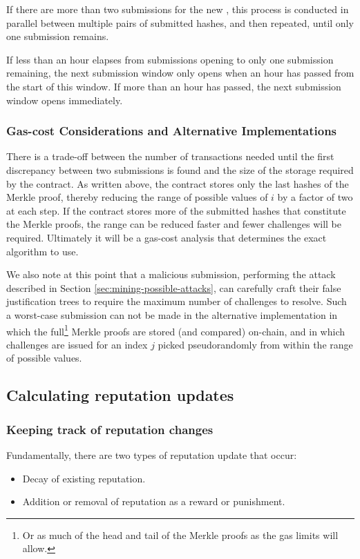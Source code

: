 If there are more than two submissions for the new , this process is conducted in parallel between multiple pairs of submitted hashes, and then repeated, until only one submission remains.

If less than an hour elapses from submissions opening to only one submission remaining, the next submission window only opens when an hour has passed from the start of this window. If more than an hour has passed, the next submission window opens immediately.

\subsubsection*{Gas-cost Considerations and Alternative Implementations}
There is a trade-off between the number of transactions needed until the first discrepancy between two submissions is found and the size of the storage required by the contract. As written above, the contract stores only the last hashes of the Merkle proof, thereby reducing the range of possible values of $i$ by a factor of two at each step. If the contract stores more of the submitted hashes that constitute the Merkle proofs, the range can be reduced faster and fewer challenges will be required. Ultimately it will be a gas-cost analysis that determines the exact algorithm to use.

We also note at this point that a malicious submission, performing the attack described in Section \ref{sec:mining-possible-attacks}, can carefully craft their false justification trees to require the maximum number of challenges to resolve. Such a worst-case submission can not be made in the alternative implementation in which the full\footnote{Or as much of the head and tail of the Merkle proofs as the gas limits will allow.} Merkle proofs are stored (and compared) on-chain, and in which challenges are issued for an index $j$ picked pseudorandomly from within the range of possible values.

\subsection{Calculating reputation updates}\label{sec:calculating-reputation-updates}
%
\subsubsection{Keeping track of reputation changes}
%
Fundamentally, there are two types of reputation update that occur:
\begin{itemize}
 \item Decay of existing reputation.
 \item Addition or removal of reputation as a reward or punishment.
\end{itemize}

